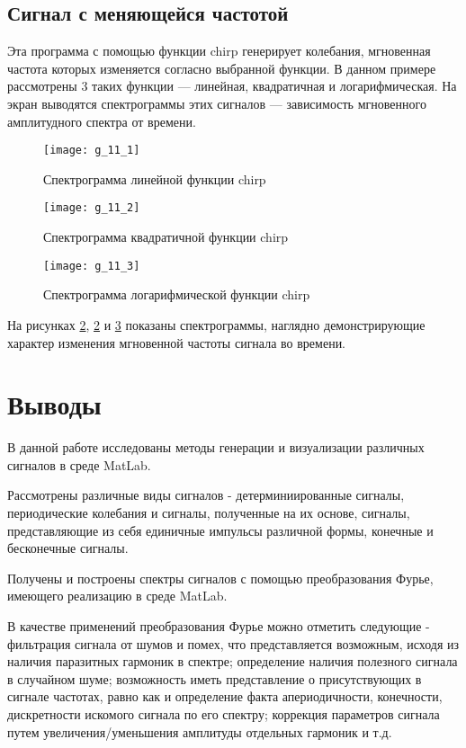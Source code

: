 \subsection{Сигнал с меняющейся частотой}


\parindent=1cm
Эта программа с помощью функции chirp генерирует колебания, мгновенная частота которых изменяется согласно выбранной функции. В данном примере рассмотрены 3 таких функции — линейная, квадратичная и логарифмическая. На экран выводятся спектрограммы этих сигналов — зависимость мгновенного амплитудного спектра от времени.

\begin{figure}[H]
	\begin{center}
		\texttt{[image: g\_11\_1]}
		\caption{Спектрограмма линейной функции chirp} 
		\label{pic:g_11_1} %
	\end{center}
\end{figure}
\begin{figure}[H]
	\begin{center}
		\texttt{[image: g\_11\_2]}
		\caption{Спектрограмма квадратичной функции chirp} 
		\label{pic:g_11_2} %
	\end{center}
\end{figure}
\begin{figure}[H]
	\begin{center}
		\texttt{[image: g\_11\_3]}
		\caption{Спектрограмма логарифмической функции chirp} 
		\label{pic:g_11_3} %
	\end{center}
\end{figure}
На рисунках \ref{pic:g_11_2}, \ref{pic:g_11_2} и \ref{pic:g_11_3} показаны спектрограммы, наглядно демонстрирующие характер изменения мгновенной частоты сигнала во времени.

\section{Выводы}

В данной работе исследованы методы генерации и визуализации различных сигналов в среде MatLab. 

Рассмотрены различные виды сигналов - детерминиированные сигналы, периодические колебания и сигналы, полученные на их основе, сигналы, представляющие из себя единичные импульсы различной формы, конечные и бесконечные сигналы.

Получены и построены спектры сигналов с помощью преобразования Фурье, имеющего реализацию в среде MatLab.

В качестве применений преобразования Фурье можно отметить следующие - фильтрация сигнала от шумов и помех, что представляется возможным, исходя из наличия паразитных гармоник в спектре; определение наличия полезного сигнала в случайном шуме; возможность иметь представление о присутствующих в сигнале частотах, равно как и определение факта апериодичности, конечности, дискретности искомого сигнала по его спектру; коррекция параметров сигнала путем увеличения/уменьшения амплитуды отдельных гармоник и т.д.


